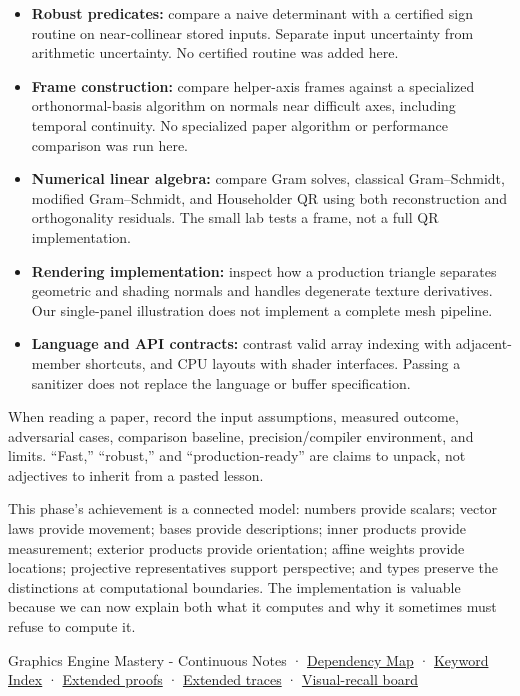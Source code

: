 \begin{itemize}
\tightlist
\item
  \textbf{Robust predicates:} compare a naive determinant with a certified sign routine on near-collinear stored inputs. Separate input uncertainty from arithmetic uncertainty. No certified routine was added here.
\item
  \textbf{Frame construction:} compare helper-axis frames against a specialized orthonormal-basis algorithm on normals near difficult axes, including temporal continuity. No specialized paper algorithm or performance comparison was run here.
\item
  \textbf{Numerical linear algebra:} compare Gram solves, classical Gram--Schmidt, modified Gram--Schmidt, and Householder QR using both reconstruction and orthogonality residuals. The small lab tests a frame, not a full QR implementation.
\item
  \textbf{Rendering implementation:} inspect how a production triangle separates geometric and shading normals and handles degenerate texture derivatives. Our single-panel illustration does not implement a complete mesh pipeline.
\item
  \textbf{Language and API contracts:} contrast valid array indexing with adjacent-member shortcuts, and CPU layouts with shader interfaces. Passing a sanitizer does not replace the language or buffer specification.
\end{itemize}

When reading a paper, record the input assumptions, measured outcome, adversarial cases, comparison baseline, precision/compiler environment, and limits. ``Fast,'' ``robust,'' and ``production-ready'' are claims to unpack, not adjectives to inherit from a pasted lesson.

This phase's achievement is a connected model: numbers provide scalars; vector laws provide movement; bases provide descriptions; inner products provide measurement; exterior products provide orientation; affine weights provide locations; projective representatives support perspective; and types preserve the distinctions at computational boundaries. The implementation is valuable because we can now explain both what it computes and why it sometimes must refuse to compute it.

{Graphics Engine Mastery - Continuous Notes} · \hyperref[appendix-4ad47bdd269a]{Dependency Map} · \hyperref[appendix-a6d556a4ef50]{Keyword Index} · \hyperref[02-foundations-ii-ch039-phase-6---geometry-reconstruction-proofs]{Extended proofs} · \hyperref[appendix-92ff77d4dfdc-phase-6---the-robot-panel-tracebook]{Extended traces} · \hyperref[appendix-38d9c8aca357]{Visual-recall board}

